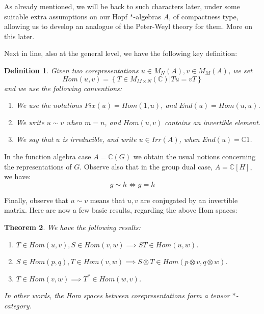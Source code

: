\documentclass[12pt]{amsbook}
\newtheorem{theorem}{Theorem}[chapter]
\newtheorem{definition}[theorem]{Definition}
\begin{document}
As already mentioned, we will be back to such characters later, under some suitable extra assumptions on our Hopf $*$-algebras $A$, of compactness type, allowing us to develop an analogue of the Peter-Weyl theory for them. More on this later.

\bigskip

Next in line, also at the general level, we have the following key definition:


\begin{definition}
Given two corepresentations $u\in M_N(A),v\in M_M(A)$, we set 
$$Hom(u,v)=\left\{T\in M_{M\times N}(\mathbb C)\Big|Tu=vT\right\}$$
and we use the following conventions:
\begin{enumerate}
\item We use the notations $Fix(u)=Hom(1,u)$, and $End(u)=Hom(u,u)$.

\item We write $u\sim v$ when $m=n$, and $Hom(u,v)$ contains an invertible element.

\item We say that $u$ is irreducible, and write $u\in Irr(A)$, when $End(u)=\mathbb C1$.
\end{enumerate}
\end{definition}

In the function algebra case $A=\mathbb C(G)$ we obtain the usual notions concerning the representations of $G$. Observe also that in the group dual case, $A=\mathbb C[H]$, we have:
$$g\sim h\iff g=h$$

Finally, observe that $u\sim v$ means that $u,v$ are conjugated by an invertible matrix. Here are now a few basic results, regarding the above Hom spaces:


\begin{theorem}
We have the following results:
\begin{enumerate}
\item $T\in Hom(u,v),S\in Hom(v,w)\implies ST\in Hom(u,w)$.

\item $S\in Hom(p,q),T\in Hom(v,w)\implies S\otimes T\in Hom(p\otimes v,q\otimes w)$.

\item $T\in Hom(v,w)\implies T^*\in Hom(w,v)$.
\end{enumerate}
In other words, the Hom spaces between corepresentations form a tensor $*$-category.
\end{theorem}
\end{document}
